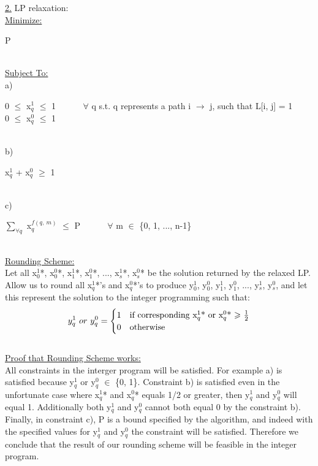 \documentclass[10pt]{csc_assignment}
\begin{document}
\begin{description}
\underline{2.} LP relaxation:\\
\underline{Minimize:}\\
\hspace*{1cm}\parbox{15cm}{
P
}\\
\underline{Subject To:}\\
a) \\
\hspace*{1cm}\parbox{15cm}{
0 $\leqslant$ x$_{q}^1$ $\leqslant$ 1 ~~~~~ $\forall$ q s.t. q represents a path i $\rightarrow$ j, such that L[i, j] = 1\\
0 $\leqslant$ x$_{q}^0$ $\leqslant$ 1 
}\\
b)\\
\hspace*{1cm}\parbox{15cm}{
x$_{q}^1$ + x$_{q}^0$ $\geqslant$ 1\\
}\\
c)\\
\hspace*{1cm}\parbox{15cm}{
$\sum_{\forall q}$ x$_{q}^{f(q,~ m)}$ $\leqslant$ P ~~~~~ $\forall$ m $\in$ \{0, 1, ..., n-1\}\\
}\\
\underline{Rounding Scheme:}\\
Let all x$_{0}^1$*, x$_{0}^0$*, x$_{1}^1$*, x$_{1}^0$*, ..., x$_{s}^1$*, x$_{s}^0$* be the solution returned by the relaxed LP. Allow us to round all x$_{q}^1$*'s and x$_{q}^0$*'s to produce y$_{0}^1$, y$_{0}^0$, y$_{1}^1$, y$_{1}^0$, ..., y$_{s}^1$, y$_{s}^0$, and let this represent the solution to the integer programming such that:\\
\[
y_{q}^1 ~or~ y_{q}^0 = 
\begin{cases} 
      \hfill 1 \hfill & \text{if corresponding x$_{q}^1$* or x$_{q}^0$* $\geqslant$ $\frac{1}{2}$} \\
      \hfill 0 \hfill & \text{otherwise} \\
  \end{cases}
\]\\
\underline{Proof that Rounding Scheme works:}\\
All constraints in the interger program will be satisfied. For example a) is satisfied because y$_{q}^1$ or y$_{q}^0$ $\in$ \{0, 1\}. Constraint b) is satisfied even in the unfortunate case where x$_{q}^1$* and x$_{q}^0$* equals 1/2 or greater, then y$_{q}^1$ and y$_{q}^0$ will equal 1. Additionally both y$_{q}^1$ and y$_{q}^0$ cannot both equal 0 by the constraint b). Finally, in constraint c), P is a bound specified by the algorithm, and indeed with the specified values for y$_{q}^1$ and y$_{q}^0$ the constraint will be satisfied. Therefore we conclude that the result of our rounding scheme will be feasible in the integer program.\\

\end{description}
\end{document}
